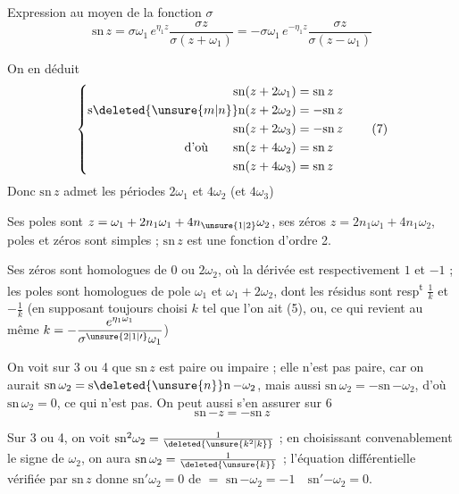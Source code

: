 Expression au moyen de la fonction $\sigma$
\[
\boxed{\mathrm{sn}\,z=\sigma\omega_1\,e^{\eta_1 z}\frac{\sigma z}{\sigma(z+\omega_1)}
=-\sigma\omega_1\,e^{-\eta_1 z}\frac{\sigma z}{\sigma(z-\omega_1)}} \tag*{(6)}
\]

 

On en déduit
\[
\left\{\begin{aligned}
\mathrm{sn}(z+2\omega_1)&=\mathrm{sn}\,z\\
\mathrm{s}\deleted{\unsure{m|n}}\mathrm{n}(z+2\omega_2)&=-\mathrm{sn}\,z\\
\mathrm{sn}(z+2\omega_3)&=-\mathrm{sn}\,z\\
\text{d'où}\qquad\mathrm{sn}(z+4\omega_2)&=\mathrm{sn}\,z\\
\mathrm{sn}(z+4\omega_3)&=\mathrm{sn}\,z
\end{aligned}\right. \tag*{(7)}
\]
Donc $\mathrm{sn}\,z$ admet les périodes $2\omega_1$ et $4\omega_2$ (et $4\omega_3$)

Ses poles sont $z=\omega_1+2n_1\omega_1+4n_{\unsure{1|2}}\omega_2$, ses zéros $z=2n_1\omega_1+4n_1\omega_2$, poles et zéros sont simples ; $\mathrm{sn}\,z$ est une fonction d'ordre 2.

Ses zéros sont homologues de $0$ ou $2\omega_{2}$, où la dérivée est respectivement $1$ et $-1$ ; les poles sont homologues de pole $\omega_1$ et $\omega_1+2\omega_2$, dont les résidus sont resp\textsuperscript{t} $\frac{1}{k}$ et $-\frac{1}{k}$ (en supposant toujours choisi  $k$ tel que l'on ait (5), ou, ce qui revient au même $\displaystyle k=-\frac{e^{\eta_1\omega_1}}{\sigma^{\unsure{2|1|\prime}}\omega_1}$)

On voit sur 3 ou 4 que $\mathrm{sn}\,z$ est paire ou impaire ; elle n'est pas paire, car on aurait $\mathrm{sn}\,\omega_2=\mathrm{s}\deleted{\unsure{n}}\mathrm{n}\,{-\omega_2}$, mais aussi $\mathrm{sn}\,\omega_2=-\mathrm{sn}\,{-\omega_2}$, d'où $\mathrm{sn}\,\omega_2=0$, ce qui n'est pas. On peut aussi s'en assurer sur 6
\[
\boxed{\mathrm{sn}\,{-z}=-\mathrm{sn}\,z}
\]

Sur 3 ou 4, on voit $\mathrm{sn}^2\omega_2=\frac{1}{\deleted{\unsure{k^2|k}}}$ ; en choisissant convenablement le signe de $\omega_2$, on aura \uline{$\mathrm{sn}\,\omega_2=\frac{1}{\deleted{\unsure{k}}}$} ; l'équation différentielle vérifiée par $\mathrm{sn}\,z$ donne \uline{$\mathrm{sn}'\omega_2=0$} de $=$ $\mathrm{sn}\,{-\omega_2}=-1\quad\mathrm{sn}'{-\omega_2}=0$.

